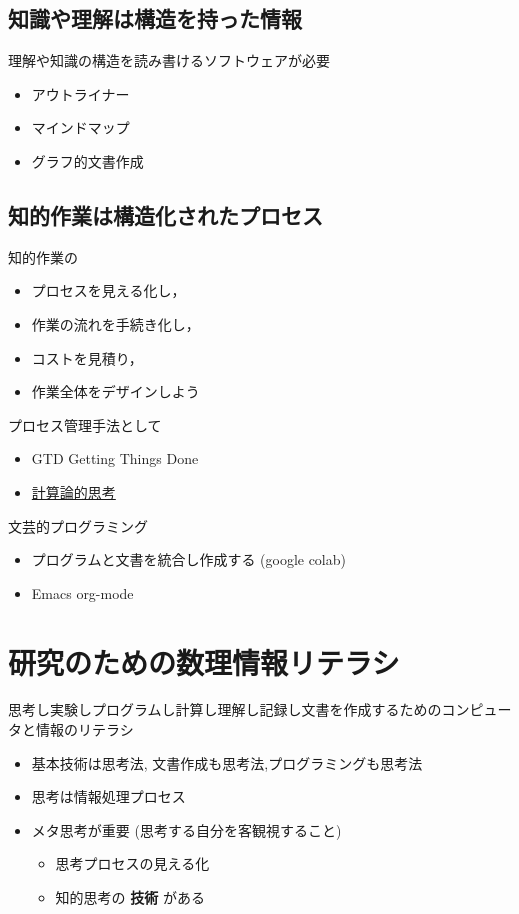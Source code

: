 \documentclass[dvipdfmx,11pat]{jarticle}
\begin{document}
\subsection{知識や理解は構造を持った情報}
\label{sec:org28fce6b}

理解や知識の構造を読み書けるソフトウェアが必要
\begin{itemize}
\item アウトライナー
\item マインドマップ
\item グラフ的文書作成
\end{itemize}
\subsection{知的作業は構造化されたプロセス}
\label{sec:org5a04150}
知的作業の
\begin{itemize}
\item プロセスを見える化し，
\item 作業の流れを手続き化し，
\item コストを見積り，
\item 作業全体をデザインしよう
\end{itemize}

プロセス管理手法として
\begin{itemize}
\item GTD Getting Things Done
\item \href{./comp\_tinking.org}{計算論的思考}
\end{itemize}


文芸的プログラミング
\begin{itemize}
\item プログラムと文書を統合し作成する (google colab)
\item Emacs org-mode
\end{itemize}
\section{研究のための数理情報リテラシ}
\label{sec:orga4c4540}

思考し実験しプログラムし計算し理解し記録し文書を作成するためのコンピュー
タと情報のリテラシ

\begin{itemize}
\item 基本技術は思考法, 文書作成も思考法,プログラミングも思考法
\item 思考は情報処理プロセス
\item メタ思考が重要 (思考する自分を客観視すること)
\begin{itemize}
\item 思考プロセスの見える化
\item 知的思考の \textbf{技術} がある
\end{itemize}
\end{itemize}
\end{document}
